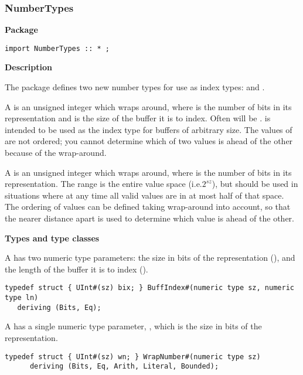 \subsubsection{NumberTypes}
\label{sec-NumberTypes}

{\bf Package}

\begin{verbatim}
import NumberTypes :: * ;
\end{verbatim}



{\bf Description}

The  package defines two new number types for use as
 index types:   and . 

A  is an unsigned integer which wraps around,
where  is the number of bits in its representation and  is
the size of the buffer it is to index.  Often  will be
.  
 is   intended to be used as the
index type for buffers of arbitrary size.  The values of
 are not ordered; you  
cannot determine which of two values is ahead of the other because of the
wrap-around.

A  is an  unsigned integer which wraps around,
where  is the number of bits in its representation.  The range
is the entire value space (i.e.$2^{sz}$), but should  be used in
situations where at any time all valid values are in at most half of
that space.   The ordering of values can be defined
taking wrap-around into account, so that the nearer distance apart is
used to determine which value is ahead of the other.  


{\bf Types and type classes}


A   has two numeric type parameters: the size in
bits of the representation (), and the length of the buffer it
is to index ().

\begin{verbatim}
typedef struct { UInt#(sz) bix; } BuffIndex#(numeric type sz, numeric type ln)
   deriving (Bits, Eq);
\end{verbatim}


A  has a single numeric type parameter, , which
is the size in bits of the representation.

\begin{verbatim}
typedef struct { UInt#(sz) wn; } WrapNumber#(numeric type sz)
      deriving (Bits, Eq, Arith, Literal, Bounded);

\end{verbatim}

